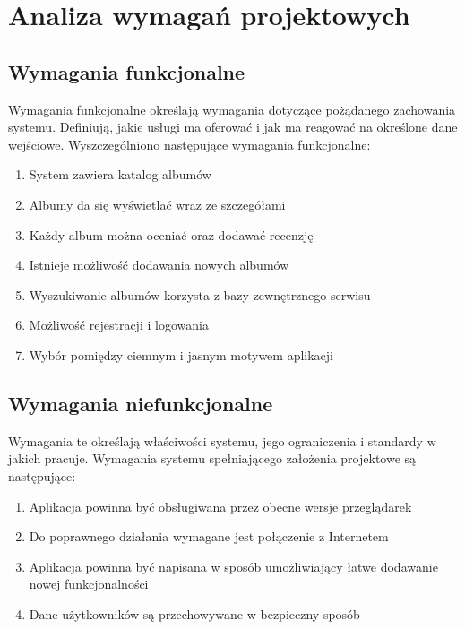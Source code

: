 
\chapter{Analiza wymagań projektowych}
\label{sec:analiza}

\section{Wymagania funkcjonalne}
	Wymagania funkcjonalne określają wymagania dotyczące pożądanego zachowania systemu.
	Definiują, jakie usługi ma oferować i jak ma reagować na określone dane wejściowe.
	Wyszczególniono następujące wymagania funkcjonalne:
	\begin{enumerate}
		\item System zawiera katalog albumów
		\item Albumy da się wyświetlać wraz ze szczegółami
		\item Każdy album można oceniać oraz dodawać recenzję
		\item Istnieje możliwość dodawania nowych albumów
		\item Wyszukiwanie albumów korzysta z bazy zewnętrznego serwisu
		\item Możliwość rejestracji i logowania
		\item Wybór pomiędzy ciemnym i jasnym motywem aplikacji
	\end{enumerate}

\section{Wymagania niefunkcjonalne}
	Wymagania te określają właściwości systemu, jego ograniczenia i standardy w jakich pracuje.
	Wymagania systemu spełniającego założenia projektowe są następujące:
	\begin{enumerate}
		\item Aplikacja powinna być obsługiwana przez obecne wersje przeglądarek
		\item Do poprawnego działania wymagane jest połączenie z Internetem
		\item Aplikacja powinna być napisana w sposób umożliwiający łatwe dodawanie nowej funkcjonalności
		\item Dane użytkowników są przechowywane w bezpieczny sposób
	\end{enumerate}

